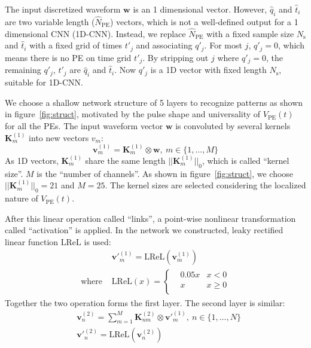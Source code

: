 The input discretized waveform $\bm{w}$ is an 1 dimensional vector.  However, $\hat{q}_i$ and $\hat{t}_i$ are two variable length ($\hat{N}_\mathrm{PE}$) vectors, which is not a well-defined output for a 1 dimensional CNN (1D-CNN).  Instead, we replace $\hat{N}_\mathrm{PE}$ with a fixed sample size $N_\mathrm{s}$ and $\hat{t}_i$ with a fixed grid of times $t'_j$ and associating $q'_j$. For most $j$, $q'_j = 0$, which means there is no PE on time grid $t'_j$. By stripping out $j$ where $q'_j=0$, the remaining $q'_j$, $t'_j$ are $\hat{q}_i$ and $\hat{t}_i$.  Now $q'_j$ is a 1D vector with fixed length $N_\mathrm{s}$, suitable for 1D-CNN.

We choose a shallow network structure of 5 layers to recognize patterns as shown in figure~\ref{fig:struct}, motivated by the pulse shape and universality of $V_\mathrm{PE}(t)$ for all the PEs. The input waveform vector $\bm{w}$ is convoluted by several kernels $\bm{K}^{(1)}_m$ into new vectors $v_m$:
\begin{equation}
  \bm{v}^{(1)}_m = \bm{K}^{(1)}_m \otimes \bm{w},\ m\in \{1,\ldots,M\}
  \label{eq:1DCNN-11}
\end{equation}
As 1D vectors, $\bm{K}^{(1)}_m$ share the same length $||\bm{K}^{(1)}_m||_0$, which is called ``kernel size''. $M$ is the ``number of channels''. As shown in figure~\ref{fig:struct}, we choose $||\bm{K}^{(1)}_m||_0 = 21$ and $M=25$. The kernel sizes are selected considering the localized nature of $V_\mathrm{PE}(t)$.

After this linear operation called ``links'', a point-wise nonlinear transformation called ``activation'' is applied. In the network we constructed, leaky rectified linear function $\mathrm{LReL}$\cite{leakyReLU} is used:
\begin{equation}
  \begin{aligned}
    & \bm{v'}^{(1)}_m = \mathrm{LReL}(\bm{v}^{(1)}_m) \\
    \text{where  } & \mathrm{LReL}(x) = \left\{ \begin{aligned}
      & 0.05 x & x<0 \\
      & x & x\geqslant 0 \\
    \end{aligned} \right.
  \end{aligned}
  \label{eq:1DCNN-12}
\end{equation}
Together the two operation forms the first layer. The second layer is similar:
\begin{equation}
  \begin{aligned}
    & \bm{v}^{(2)}_n = \sum_{m=1}^{M} \bm{K}^{(2)}_{nm} \otimes \bm{v'}^{(1)}_m,\ n\in \{1,\ldots,N\} \\
    & \bm{v'}^{(2)}_n = \mathrm{LReL}(\bm{v}^{(2)}_n) \\
  \end{aligned}
  \label{eq:1DCNN-2}
\end{equation}

